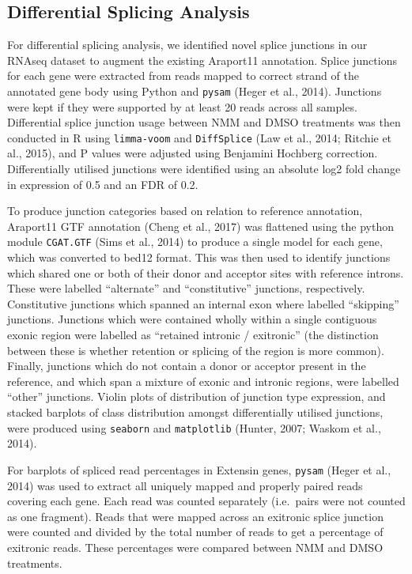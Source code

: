 \documentclass[12pt,a4paper,]{report}
\begin{document}
\hypertarget{differential-splicing-analysis}{%
\subsection{Differential Splicing
Analysis}\label{differential-splicing-analysis}}

For differential splicing analysis, we identified novel splice junctions
in our RNAseq dataset to augment the existing Araport11 annotation.
Splice junctions for each gene were extracted from reads mapped to
correct strand of the annotated gene body using Python and
\texttt{pysam} (Heger et al., 2014). Junctions were kept if they were
supported by at least 20 reads across all samples. Differential splice
junction usage between NMM and DMSO treatments was then conducted in R
using \texttt{limma-voom} and \texttt{DiffSplice} (Law et al., 2014;
Ritchie et al., 2015), and P values were adjusted using Benjamini
Hochberg correction. Differentially utilised junctions were identified
using an absolute log2 fold change in expression of 0.5 and an FDR of
0.2.

To produce junction categories based on relation to reference
annotation, Araport11 GTF annotation (Cheng et al., 2017) was flattened
using the python module \texttt{CGAT.GTF} (Sims et al., 2014) to produce
a single model for each gene, which was converted to bed12 format. This
was then used to identify junctions which shared one or both of their
donor and acceptor sites with reference introns. These were labelled
``alternate'' and ``constitutive'' junctions, respectively. Constitutive
junctions which spanned an internal exon where labelled ``skipping''
junctions. Junctions which were contained wholly within a single
contiguous exonic region were labelled as ``retained intronic /
exitronic'' (the distinction between these is whether retention or
splicing of the region is more common). Finally, junctions which do not
contain a donor or acceptor present in the reference, and which span a
mixture of exonic and intronic regions, were labelled ``other''
junctions. Violin plots of distribution of junction type expression, and
stacked barplots of class distribution amongst differentially utilised
junctions, were produced using \texttt{seaborn} and \texttt{matplotlib}
(Hunter, 2007; Waskom et al., 2014).

For barplots of spliced read percentages in Extensin genes,
\texttt{pysam} (Heger et al., 2014) was used to extract all uniquely
mapped and properly paired reads covering each gene. Each read was
counted separately (i.e.~pairs were not counted as one fragment). Reads
that were mapped across an exitronic splice junction were counted and
divided by the total number of reads to get a percentage of exitronic
reads. These percentages were compared between NMM and DMSO treatments.
\end{document}
